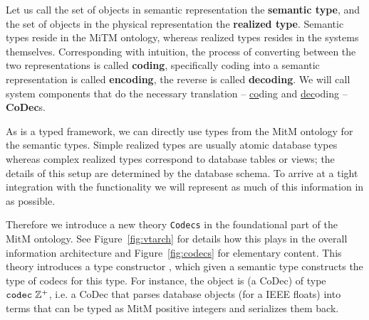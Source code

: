 Let us call the set of objects in semantic representation the \textbf{semantic type}, and
the set of objects in the physical representation the \textbf{realized type}.  Semantic
types reside in the MiTM ontology, whereas realized types resides in the systems
themselves. Corresponding with intuition, the process of converting between the two
representations is called \textbf{coding}, specifically coding into a semantic
representation is called \textbf{encoding}, the reverse is called \textbf{decoding}. We
will call system components that do the necessary translation -- \underline{co}ding and
\underline{dec}oding -- \textbf{CoDec}s. 

As \ommt is a typed framework, we can directly use \ommt types from the MitM ontology for
the semantic types. Simple realized types are usually atomic database types whereas
complex realized types correspond to database tables or views; the details of this setup
are determined by the database schema. To arrive at a tight integration with the \ommt
functionality we will represent as much of this information in \ommt as possible.

Therefore we introduce a new \ommt theory \texttt{Codecs} in the foundational part of the
MitM ontology. See Figure~\ref{fig:vtarch} for details how this plays in the overall
information architecture and Figure~\ref{fig:codecs} for elementary content. This theory
introduces a type constructor \codectt, which given a semantic type constructs the type of
codecs for this type. For instance, the object  is (a CoDec) of
type $\codectt\;\mathbb{Z}^+$, i.e. a CoDec that parses database objects (for \lmfdb a
IEEE floats) into \ommt terms that can be typed as MitM positive integers and serializes
them back.

